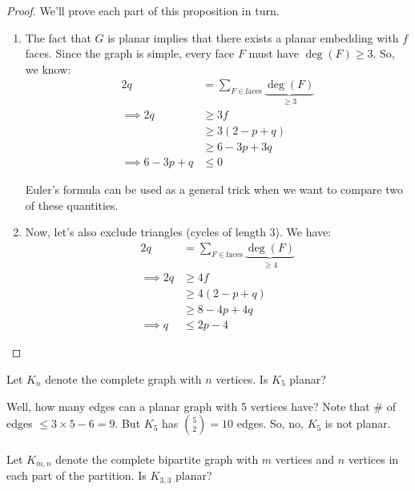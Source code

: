 \documentclass[]{article}
\theoremstyle{definition}
\begin{document}
			\begin{proof}
				We'll prove each part of this proposition in turn.
				\begin{enumerate}
					\item
						The fact that $G$ is planar implies that there exists a planar embedding with $f$ faces. Since the graph is simple, every face $F$ must have $\deg(F) \ge 3$. So, we know:
						\begin{align*}
							2q &= \sum_{F \in \text{faces}} \underbrace{\deg(F)}_{\ge 3} \\
							\implies 2q &\ge 3f \\
							&\ge 3(2 - p + q) \\
							&\ge 6 - 3p + 3q \\
							\implies 6 - 3p + q &\le 0
						\end{align*}

						Euler's formula can be used as a general trick when we want to compare two of these quantities.

					\item
						Now, let's also exclude triangles (cycles of length 3). We have:
						\begin{align*}
							2q &= \sum_{F \in \text{faces}} \underbrace{\deg(F)}_{\ge 4} \\
							\implies 2q &\ge 4f \\
							&\ge 4(2 - p + q) \\
							&\ge 8 - 4p + 4q \\
							\implies q &\le 2p - 4
						\end{align*}
				\end{enumerate}
			\end{proof}

			Let $K_n$ denote the complete graph with $n$ vertices. Is $K_5$ planar?
			\begin{center}
			\end{center}

			Well, how many edges can a planar graph with 5 vertices have? Note that \# of edges $\le 3 \times 5 - 6 = 9$. But $K_5$ has $\binom{5}{2} = 10$ edges. So, no, $K_5$ is not planar.
			\\ \\
			Let $K_{m, n}$ denote the complete bipartite graph with $m$ vertices and $n$ vertices in each part of the partition. Is $K_{3,3}$ planar?
\end{document}
